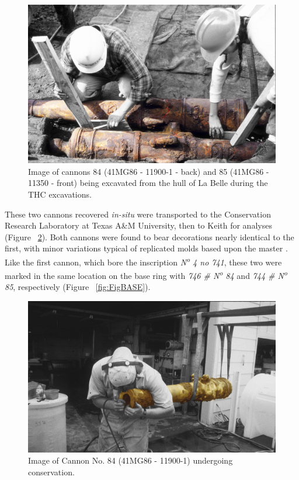 \documentclass[review]{elsarticle}
\begin{document}
\begin{figure}[ht]\centering
\includegraphics[width=\linewidth]{FigExcavate2}
\caption{Image of cannons 84 (41MG86 - 11900-1 - back) and 85 (41MG86 - 11350 - front) being excavated from the hull of La Belle during the THC excavations.}
\label{fig:FigExcavate}
\end{figure}

These two cannons recovered \textit{in-situ} were transported to the Conservation Research Laboratory at Texas A\&M University, then to Keith for analyses (Figure ~\ref{fig:FigConserve}). Both cannons were found to bear decorations nearly identical to the first, with minor variations typical of replicated molds based upon the master \citep[361]{RN5763}. Like the first cannon, which bore the inscription \textit{N\textsuperscript{o} 4 no 741}, these two were marked in the same location on the base ring with \textit{746 \# N\textsuperscript{o} 84} and \textit{744 \# N\textsuperscript{o} 85}, respectively (Figure ~\ref{fig:FigBASE}).

\begin{figure}[ht]\centering
\includegraphics[width=\linewidth]{FigConserve2}
\caption{Image of Cannon No. 84 (41MG86 - 11900-1) undergoing conservation.}
\label{fig:FigConserve}
\end{figure}
\end{document}
